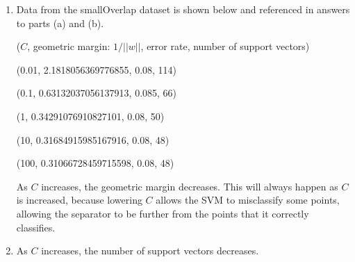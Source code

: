 \documentclass{paper}
\begin{document}
\begin{enumerate}
\begin{enumerate}
        \item

            Data from the smallOverlap dataset is shown below and referenced in answers to parts (a) and (b).

            ($C$, geometric margin: $1/||w||$, error rate, number of support vectors)
            
            (0.01, 2.1818056369776855, 0.08, 114)
            
            (0.1, 0.63132037056137913, 0.085, 66)
            
            (1, 0.34291076910827101, 0.08, 50)
            
            (10, 0.31684915985167916, 0.08, 48)
            
            (100, 0.31066728459715598, 0.08, 48)

            As $C$ increases, the geometric margin decreases. This will always happen as $C$ is increased, because lowering $C$ allows the SVM to misclassify some points, allowing the separator to be further from the points that it correctly classifies. 

        \item

            As $C$ increases, the number of support vectors decreases.
    \end{enumerate}

\end{enumerate}
\end{document}
